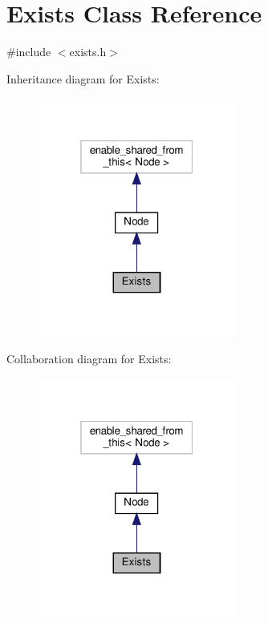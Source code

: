 \hypertarget{class_exists}{}\section{Exists Class Reference}
\label{class_exists}


{\ttfamily \#include $<$exists.\+h$>$}



Inheritance diagram for Exists\+:\nopagebreak
\begin{figure}[H]
\begin{center}
\leavevmode
\includegraphics[width=184pt]{d0/d4c/class_exists__inherit__graph}
\end{center}
\end{figure}


Collaboration diagram for Exists\+:\nopagebreak
\begin{figure}[H]
\begin{center}
\leavevmode
\includegraphics[width=184pt]{d2/d90/class_exists__coll__graph}
\end{center}
\end{figure}
